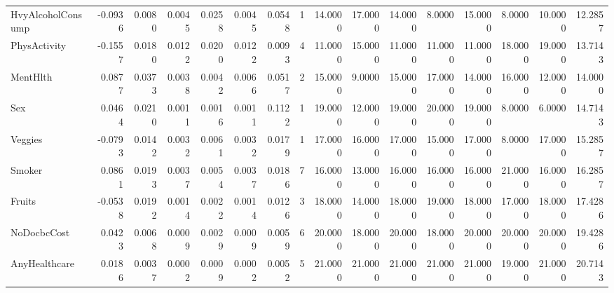 \begin{tabular}{lrrrrrrrrrrrrrrr}
HvyAlcoholConsump & -0.0936 & 0.0080 & 0.0045 & 0.0258 & 0.0045 & 0.0548 & 1 & 14.0000 & 17.0000 & 14.0000 & 8.0000 & 15.0000 & 8.0000 & 10.0000 & 12.2857 \\
PhysActivity & -0.1557 & 0.0180 & 0.0122 & 0.0200 & 0.0122 & 0.0093 & 4 & 11.0000 & 15.0000 & 11.0000 & 11.0000 & 11.0000 & 18.0000 & 19.0000 & 13.7143 \\
MentHlth & 0.0877 & 0.0373 & 0.0038 & 0.0042 & 0.0066 & 0.0517 & 2 & 15.0000 & 9.0000 & 15.0000 & 17.0000 & 14.0000 & 16.0000 & 12.0000 & 14.0000 \\
Sex & 0.0464 & 0.0210 & 0.0011 & 0.0016 & 0.0011 & 0.1122 & 1 & 19.0000 & 12.0000 & 19.0000 & 20.0000 & 19.0000 & 8.0000 & 6.0000 & 14.7143 \\
Veggies & -0.0793 & 0.0142 & 0.0032 & 0.0061 & 0.0032 & 0.0179 & 1 & 17.0000 & 16.0000 & 17.0000 & 15.0000 & 17.0000 & 8.0000 & 17.0000 & 15.2857 \\
Smoker & 0.0861 & 0.0193 & 0.0037 & 0.0054 & 0.0037 & 0.0186 & 7 & 16.0000 & 13.0000 & 16.0000 & 16.0000 & 16.0000 & 21.0000 & 16.0000 & 16.2857 \\
Fruits & -0.0538 & 0.0192 & 0.0014 & 0.0022 & 0.0014 & 0.0126 & 3 & 18.0000 & 14.0000 & 18.0000 & 19.0000 & 18.0000 & 17.0000 & 18.0000 & 17.4286 \\
NoDocbcCost & 0.0423 & 0.0068 & 0.0009 & 0.0029 & 0.0009 & 0.0059 & 6 & 20.0000 & 18.0000 & 20.0000 & 18.0000 & 20.0000 & 20.0000 & 20.0000 & 19.4286 \\
AnyHealthcare & 0.0186 & 0.0037 & 0.0002 & 0.0009 & 0.0002 & 0.0052 & 5 & 21.0000 & 21.0000 & 21.0000 & 21.0000 & 21.0000 & 19.0000 & 21.0000 & 20.7143 \\
\bottomrule
\end{tabular}
